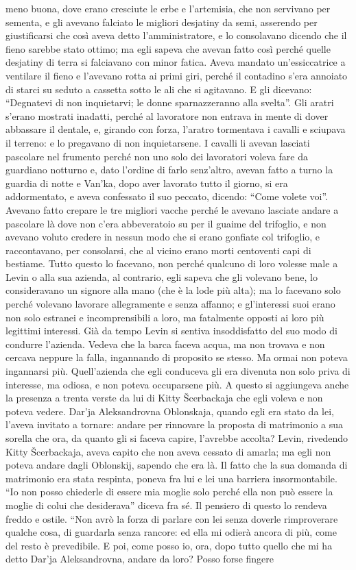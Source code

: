 meno buona, dove erano cresciute le erbe e l'artemisia, che non servivano per sementa, e gli avevano falciato le migliori desjatiny da semi, asserendo per giustificarsi che così aveva detto l'amministratore, e lo consolavano dicendo che il fieno sarebbe stato ottimo; ma egli sapeva che avevan fatto così perché quelle desjatiny di terra si falciavano con minor fatica. Aveva mandato un'essiccatrice a ventilare il fieno e l'avevano rotta ai primi giri, perché il contadino s'era annoiato di starci su seduto a cassetta sotto le ali che si agitavano. E gli dicevano: ``Degnatevi di non inquietarvi; le donne sparnazzeranno alla svelta''. Gli aratri s'erano mostrati inadatti, perché al lavoratore non entrava in mente di dover abbassare il dentale, e, girando con forza, l'aratro tormentava i cavalli e sciupava il terreno: e lo pregavano di non inquietarsene. I cavalli li avevan lasciati pascolare nel frumento perché non uno solo dei lavoratori voleva fare da guardiano notturno e, dato l'ordine di farlo senz'altro, avevan fatto a turno la guardia di notte e Van'ka, dopo aver lavorato tutto il giorno, si era addormentato, e aveva confessato il suo peccato, dicendo: ``Come volete voi''. Avevano fatto crepare le tre migliori vacche perché le avevano lasciate andare a pascolare là dove non c'era abbeveratoio su per il guaime del trifoglio, e non avevano voluto credere in nessun modo che si erano gonfiate col trifoglio, e raccontavano, per consolarsi, che al vicino erano morti centoventi capi di bestiame. Tutto questo lo facevano, non perché qualcuno di loro volesse male a Levin o alla sua azienda, al contrario, egli sapeva che gli volevano bene, lo consideravano un signore alla mano (che è la lode più alta); ma lo facevano solo perché volevano lavorare allegramente e senza affanno; e gl'interessi suoi erano non solo estranei e incomprensibili a loro, ma fatalmente opposti ai loro più legittimi interessi. Già da tempo Levin si sentiva insoddisfatto del suo modo di condurre l'azienda. Vedeva che la barca faceva acqua, ma non trovava e non cercava neppure la falla, ingannando di proposito se stesso. Ma ormai non poteva ingannarsi più. Quell'azienda che egli conduceva gli era divenuta non solo priva di interesse, ma odiosa, e non poteva occuparsene più. A questo si aggiungeva anche la presenza a trenta verste da lui di Kitty Šcerbackaja che egli voleva e non poteva vedere. Dar'ja Aleksandrovna Oblonskaja, quando egli era stato da lei, l'aveva invitato a tornare: andare per rinnovare la proposta di matrimonio a sua sorella che ora, da quanto gli si faceva capire, l'avrebbe accolta? Levin, rivedendo Kitty Šcerbackaja, aveva capito che non aveva cessato di amarla; ma egli non poteva andare dagli Oblonskij, sapendo che era là. Il fatto che la sua domanda di matrimonio era stata respinta, poneva fra lui e lei una barriera insormontabile. ``Io non posso chiederle di essere mia moglie solo perché ella non può essere la moglie di colui che desiderava'' diceva fra sé. Il pensiero di questo lo rendeva freddo e ostile. ``Non avrò la forza di parlare con lei senza doverle rimproverare qualche cosa, di guardarla senza rancore: ed ella mi odierà ancora di più, come del resto è prevedibile. E poi, come posso io, ora, dopo tutto quello che mi ha detto Dar'ja Aleksandrovna, andare da loro? Posso forse fingere 
